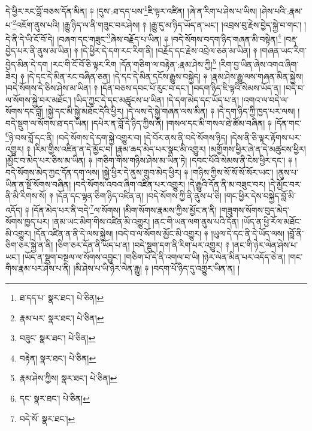 དེ་ཕྱིར་རང་བློ་བཅས་དོན་མིན། ༈ །དུས་:ཐ་དད་པས་\footnote{ཐ་དད་པ་  སྣར་ཐང་།  པེ་ཅིན། }ཇི་ལྟར་འཛིན། །ཞེ་ན་རིག་པ་ཤེས་པ་ཡིས། །ཤེས་པའི་:རྣམ་པ་\footnote{རྣམ་པར་  སྣར་ཐང་།  པེ་ཅིན། }འཇོག་ནུས་པའི། །རྒྱུ་ཉིད་ལ་ནི་གཟུང་བར་ཤེས། ༈ །རྒྱུ་དུ་མ་ཉིད་ཡོད་ན་ཡང་། །འབྲས་བུ་རྗེས་བྱེད་སྐྱེ་བ་གང་། །དེ་ནི་དེ་ཡི་ངོ་བོ་དེ། །བཞག་དང་གཟུང་\footnote{བཟུང་  སྣར་ཐང་།  པེ་ཅིན། }ཞེས་བརྗོད་པ་ཡིན། ༈ །བདེ་སོགས་བདག་ཉིད་གཞན་མི་བསྟེན།\footnote{བརྟེན།  སྣར་ཐང་།  པེ་ཅིན། } །བརྡ་བྱེད་པར་ནི་ནུས་མ་ཡིན། ༈ །དེ་ཕྱིར་དེ་དག་རང་རིག་ནི། །བརྗོད་དང་རྗེས་འབྲེལ་ཅན་མ་ཡིན། ༈ །གཞན་ཡང་རིག་བྱེད་མིན་དེ་དག །རང་གི་ངོ་བོ་ཅི་ལྟར་རིག །དོན་གཅིག་ལ་བརྟེན་:རྣམ་ཤེས་ཀྱི།\footnote{རྣམ་ཤེས་ཀྱིས།  སྣར་ཐང་།  པེ་ཅིན། } །རིག་བྱ་ཡིན་ཞེས་འགའ་ཞིག་ཟེར། ༈ །དེ་དང་དེ་མིན་རང་བཞིན་ཅན། །དེ་དང་དེ་མིན་དངོས་རྒྱུས་བསྐྱེད། ༈ །རྣམ་ཤེས་རྒྱུ་ལས་གཞན་མིན་སྐྱེས། །བདེ་སོགས་དེ་ཅིས་ཤེས་མ་ཡིན། ༈ །དོན་བཅས་དབང་པོ་རུང་བ་དང་། །བདག་ཉིད་ཇི་ལྟའི་སེམས་ཡོད་ན། །བདེ་བ་ལ་སོགས་སྐྱེ་བར་མཐོང་། །ཡིད་ཀྱང་དེ་དང་མཚུངས་པ་ཡིན། །དེ་དག་མེད་དང་ཡོད་པ་ན། །འགའ་ལ་བདེ་ལ་སོགས་དང་བློ། །སྐྱེ་དང་མི་སྐྱེ་མཐོང་དེའི་ཕྱིར། །དེ་ལས་དེ་སྐྱེ་གཞན་ལས་མིན། ༈ །དེ་དག་ཉིད་ཀྱི་ཁྱད་པར་ལས། །བདེ་སྡུག་ལ་སོགས་ཐ་དད་ཡིན། །དཔེར་ན་བློ་དེ་ཉིད་ཀྱིས་ནི། །གསལ་དང་མི་གསལ་ཐེ་ཚོམ་བཞིན། ༈ །དོན་གང་\footnote{དང་  སྣར་ཐང་།  པེ་ཅིན། }ཉེ་བས་བློ་དང་ནི། །བདེ་སོགས་དེ་དག་སྐྱེ་འགྱུར་བ། །དེ་བོར་ནས་ནི་བདེ་སོགས་ཉིད། །དེས་ནི་ཅི་ལྟར་རྟོགས་པར་འགྱུར། ༈ །རིམ་གྱིས་འཛིན་ན་དེ་མྱོང་བ། །རྣམ་ཆད་མེད་པར་སྣང་མི་འགྱུར། །མགྱོགས་ཕྱིར་ཞེ་ན་དེ་མཚུངས་ཕྱིར། །མྱོང་བ་མེད་པར་ཅིས་མ་ཡིན། ༈ །གཅིག་གིས་གཉིས་ཤེས་མ་ཡིན་ཏེ། །དབང་པོའི་སེམས་ནི་ངེས་ཕྱིར་དང་། ༈ །བདེ་སོགས་མེད་ཀྱང་དོན་དག་ལས། །སྐྱེ་ཕྱིར་དེ་ནུས་གྲུབ་མེད་ཕྱིར། ༈ །གཉིས་ཀྱིས་སོ་སོ་སོ་སོར་ཡང་། །ནུས་པ་ཡིན་ན་སྔོ་སོགས་བཞིན། །བདེ་སོགས་འབའ་ཞིག་འཛིན་པར་འགྱུར། །དེ་རྒྱུའི་དོན་ནི་མ་བཟུང་བར། །དེ་མྱོང་བར་ནི་མི་རིགས་སོ། ༈ །དོན་དང་ལྷན་ཅིག་ཉིད་འཛིན་ན། །བདེ་སོགས་ཀྱི་ནི་ནུས་པ་ཅི། །གང་ཕྱིར་དེས་བསྐྱེད་བློ་མི་འདོད། ༈ །དོན་མེད་པར་ནི་བདེ་\footnote{བདེ་སོ་  སྣར་ཐང་། }ལ་སོགས། །མིག་སོགས་རྣམས་ཀྱིས་མྱོང་ན་ནི། །གཟུགས་སོགས་བུད་མེད་སོགས་ཁྱད་པར། །ནམ་ཡང་མིག་གིས་འཛིན་མི་འགྱུར། །ནང་གི་ཡན་ལག་ནུས་པའི་དོན། །ཡོད་ན་ཕྱི་རོལ་མཐོང་མི་འགྱུར། །དོན་འཛིན་ན་ནི་དེ་ལས་སྐྱེས། །བདེ་བ་ལ་སོགས་མྱོང་མི་འགྱུར། ༈ །ཡུལ་དེ་དང་ནི་དེ་ཡོད་ལས། །བློ་ནི་ཅིག་ཅར་སྐྱེ་ན་ནི། །ཅིག་ཅར་དོན་ནི་ཡོད་པ་ན། །བདེ་སྡུག་དག་ནི་རིག་པར་འགྱུར། ༈ །ནང་གི་ཉེར་ལེན་ཤེས་པ་ཡང་། །ཡོད་ན་སྡུག་བསྔལ་ལ་སོགས་འབྱུང་། །གཅིག་པོ་དེ་ནི་འགལ་བ་ཡི། །ཉེར་ལེན་མིན་པར་འདོད་ཅེ་ན། །གང་གིས་རྣམ་པར་ཤེས་པ་ནི། །མི་ཤེས་པ་ཡི་ཉེར་ལེན་རྒྱུ། ༈ །བདག་པོ་ཉིད་དུ་འགྱུར་ཡིན་ན། །
